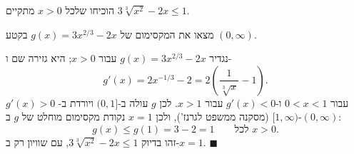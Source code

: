 
\begin{question}
הוכיחו שלכל $x>0$ מתקיים $3\sqrt[3]{x^2}-2x\le1$.
\end{question}

\begin{hint}
מצאו את המקסימום של $g(x)=3x^{2/3}-2x$ בקטע $(0,\infty)$.
\end{hint}

\begin{solution}
נגדיר $g(x)=3x^{2/3}-2x$ עבור $x>0$; היא גזירה שם ו-
\[
g'(x)=2x^{-1/3}-2=2\left(\frac{1}{\sqrt[3]x}-1\right).
\]
$g'(x)>0$ עבור $0<x<1$ ו-$g'(x)<0$ עבור $x>1$. לכן $g$ עולה ב-$(0,1]$ ויורדת ב-$[1,\infty)$ (מסקנה ממשפט לגרנז'), ולכן $x=1$ נקודת מקסימום מוחלט של $g$ ב-$(0,\infty)$:
\[
g(x)\le g(1)=3-2=1\qquad\text{לכל }x>0.
\]
זהו בדיוק $3\sqrt[3]{x^2}-2x\le1$, עם שוויון רק ב-$x=1$. $\blacksquare$
\end{solution}
